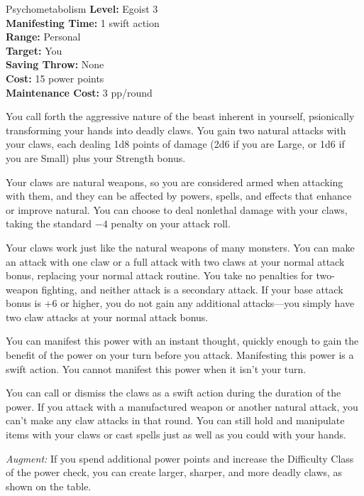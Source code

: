 {Psychometabolism}
{
	\textbf{Level:}
	Egoist 3\\
	\textbf{Manifesting Time:}
	1 swift action\\
	\textbf{Range:}
	Personal\\
	\textbf{Target:}
	You\\
	\textbf{Saving Throw:}
	None\\
	\textbf{Cost:}
	15 power points\\
	\textbf{Maintenance Cost:}
	3 pp/round\\
}
{
	You call forth the aggressive nature of the beast inherent in yourself, psionically transforming your hands into deadly claws. You gain two natural attacks with your claws, each dealing 1d8 points of damage (2d6 if you are Large, or 1d6 if you are Small) plus your Strength bonus.

	Your claws are natural weapons, so you are considered armed when attacking with them, and they can be affected by powers, spells, and effects that enhance or improve natural. You can choose to deal nonlethal damage with your claws, taking the standard $-4$ penalty on your attack roll.

	Your claws work just like the natural weapons of many monsters. You can make an attack with one claw or a full attack with two claws at your normal attack bonus, replacing your normal attack routine. You take no penalties for two-weapon fighting, and neither attack is a secondary attack. If your base attack bonus is +6 or higher, you do not gain any additional attacks—you simply have two claw attacks at your normal attack bonus.

	You can manifest this power with an instant thought, quickly enough to gain the benefit of the power on your turn before you attack. Manifesting this power is a swift action. You cannot manifest this power when it isn't your turn.

	You can call or dismiss the claws as a swift action during the duration of the power. If you attack with a manufactured weapon or another natural attack, you can't make any claw attacks in that round. You can still hold and manipulate items with your claws or cast spells just as well as you could with your hands.

	\textit{Augment:} If you spend additional power points and increase the Difficulty Class of the power check, you can create larger, sharper, and more deadly claws, as shown on the table.

}
